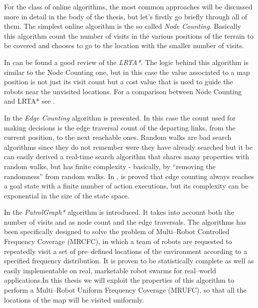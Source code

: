 For the class of online algorithms, the most common approaches will be discussed more in detail in the body of the thesis, but let's firstly go briefly through all of them.
The simplest online algorithm is the so called \emph{Node Counting}. Basically this algorithm count the number of visits in the various positions of the terrain to be covered and chooses to go to the location with the smaller number of visits.

In \cite{Ishida:1998:RSA:608597.608621} can be found a good review of the \emph{LRTA*}. The logic behind this algorithm is similar to the Node Counting one, but in this case the value associated to a map position is not just its visit count but a cost value that is used to guide the robots near the unvisited locations. For a comparison between Node Counting and LRTA* see \cite{koenig2001}.

In \cite{Koenig96easyand} the \emph{Edge Counting} algorithm is presented. In this case the count used for making decisions is the edge traversal count of the departing links, from the current position, to the next reachable ones. Random walks are bad search algorithms since they do not remember were they have already searched but it be can easily derived a real-time search algorithm that shares many properties with random walks, but has finite complexity - basically, by “removing the randomness” from random walks. In \cite{506507}, is proved that edge counting always reaches a goal state with a finite number of action executions, but its complexity can be exponential in the size of the state space.

In \cite{5711675} the \emph{PatrolGraph*} algorithm is introduced. It takes into account both the number of visits and as node count and the edge traversals. The algorithms has been specifically designed to solve the problem of Multi–Robot Controlled Frequency Coverage (MRCFC), in which a team of robots are requested to repeatedly visit a set of pre–defined locations of the environment according to a specified frequency distribution. It is proven to
be statistically complete as well as easily implementable on real, marketable robot swarms for real–world applications.In this thesis we will exploit the properties of this algorithm to perform a Multi–Robot Uniform Frequency Coverage (MRUFC), so that all the locations of the map will be visited uniformly.






